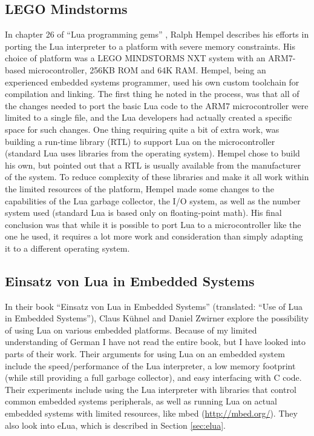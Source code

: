 \subsection{LEGO Mindstorms}
\label{sec:lego_mindstorms}
In chapter 26 of “Lua programming gems” \cite{chapter:porting_lua_microcontroller}, Ralph Hempel describes his efforts in porting the Lua interpreter to a platform with severe memory constraints. His choice of platform was a LEGO MINDSTORMS NXT system with an ARM7-based microcontroller, 256KB ROM and 64K RAM. Hempel, being an experienced embedded systems programmer, used his own custom toolchain for compilation and linking. The first thing he noted in the process, was that all of the changes needed to port the basic Lua code to the ARM7 microcontroller were limited to a single file, and the Lua developers had actually created a specific space for such changes. One thing requiring quite a bit of extra work, was building a run-time library (RTL) to support Lua on the microcontroller (standard Lua uses libraries from the operating system). Hempel chose to build his own, but pointed out that a RTL is usually available from the manufacturer of the system. To reduce complexity of these libraries and make it all work within the limited resources of the platform, Hempel made some changes to the capabilities of the Lua garbage collector, the I/O system, as well as the number system used (standard Lua is based only on floating-point math). His final conclusion was that while it is possible to port Lua to a microcontroller like the one he used, it requires a lot more work and consideration than simply adapting it to a different operating system.

\subsection{Einsatz von Lua in Embedded Systems}
\label{sec:einsatz_von_lua_embedded}
In their book “Einsatz von Lua in Embedded Systems” \cite{book:einsatz_von_lua_embedded} (translated: “Use of Lua in Embedded Systems”), Claus Kühnel and Daniel Zwirner explore the possibility of using Lua on various embedded platforms. Because of my limited understanding of German I have not read the entire book, but I have looked into parts of their work. Their arguments for using Lua on an embedded system include the speed/performance of the Lua interpreter, a low memory footprint (while still providing a full garbage collector), and easy interfacing with C code. Their experiments include using the Lua interpreter with libraries that control common embedded systems peripherals, as well as running Lua on actual embedded systems with limited resources, like mbed (\url{http://mbed.org/}). They also look into eLua, which is described in Section \ref{sec:elua}.

